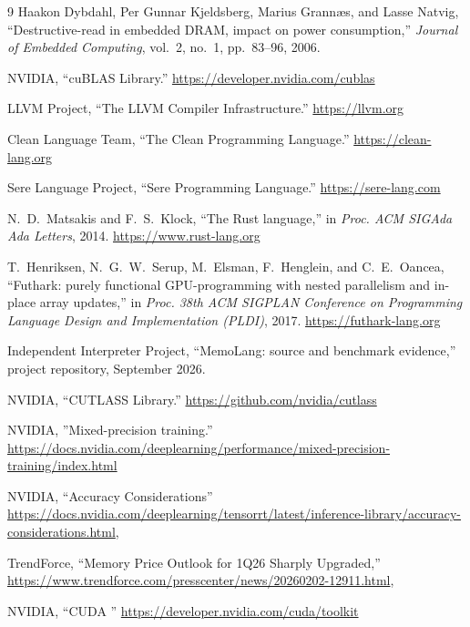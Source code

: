 \documentclass[a4paper]{article}
\begin{document}
	\begin{thebibliography}{9}
		Haakon Dybdahl, Per Gunnar Kjeldsberg, Marius Grann{\ae}s, and Lasse Natvig,
		``Destructive-read in embedded DRAM, impact on power consumption,''
		\emph{Journal of Embedded Computing}, vol.~2, no.~1, pp.~83--96, 2006.
		
		NVIDIA, ``cuBLAS Library.'' \url{https://developer.nvidia.com/cublas}
		
		LLVM Project, ``The LLVM Compiler Infrastructure.'' \url{https://llvm.org}
		
		Clean Language Team, ``The Clean Programming Language.'' \url{https://clean-lang.org}
		
		Sere Language Project, ``Sere Programming Language.'' \url{https://sere-lang.com}
		
		N.~D.~Matsakis and F.~S.~Klock, ``The Rust language,'' in \emph{Proc. ACM SIGAda Ada Letters}, 2014. \url{https://www.rust-lang.org}
		
		T.~Henriksen, N.~G.~W.~Serup, M.~Elsman, F.~Henglein, and C.~E.~Oancea, ``Futhark: purely functional GPU-programming with nested parallelism and in-place array updates,'' in \emph{Proc. 38th ACM SIGPLAN Conference on Programming Language Design and Implementation (PLDI)}, 2017. \url{https://futhark-lang.org}
		
		Independent Interpreter Project, ``MemoLang: source and benchmark evidence,'' project repository, September 2026.
		
		NVIDIA, ``CUTLASS Library.'' \url{https://github.com/nvidia/cutlass}

		NVIDIA, ''Mixed-precision training.'' \url{https://docs.nvidia.com/deeplearning/performance/mixed-precision-training/index.html}

		NVIDIA, ``Accuracy Considerations''
		\url{https://docs.nvidia.com/deeplearning/tensorrt/latest/inference-library/accuracy-considerations.html},

		TrendForce, ``Memory Price Outlook for 1Q26 Sharply Upgraded,''
		\url{https://www.trendforce.com/presscenter/news/20260202-12911.html},

		NVIDIA, ``CUDA ''
		\url{https://developer.nvidia.com/cuda/toolkit}

	\end{thebibliography}
	
\end{document}
